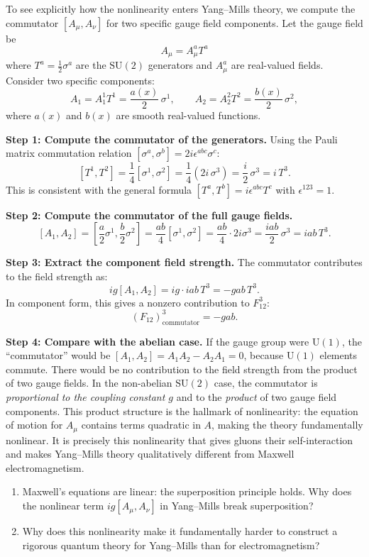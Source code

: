 \begin{example}
\label{ex:commutator}
To see explicitly how the nonlinearity enters Yang--Mills theory, we compute the commutator $[A_\mu, A_\nu]$ for two specific gauge field components. Let the gauge field be
\[
A_\mu = A_\mu^a T^a
\]
where $T^a = \frac{1}{2}\sigma^a$ are the $\mathrm{SU}(2)$ generators and $A_\mu^a$ are real-valued fields. Consider two specific components:
\[
A_1 = A_1^1 T^1 = \frac{a(x)}{2}\,\sigma^1, \qquad A_2 = A_2^2 T^2 = \frac{b(x)}{2}\,\sigma^2,
\]
where $a(x)$ and $b(x)$ are smooth real-valued functions.

\textbf{Step 1: Compute the commutator of the generators.}
Using the Pauli matrix commutation relation $[\sigma^a, \sigma^b] = 2i\epsilon^{abc}\sigma^c$:
\[
[T^1, T^2] = \frac{1}{4}[\sigma^1, \sigma^2] = \frac{1}{4}(2i\,\sigma^3) = \frac{i}{2}\,\sigma^3 = i\,T^3.
\]
This is consistent with the general formula $[T^a, T^b] = i\epsilon^{abc}T^c$ with $\epsilon^{123} = 1$.

\textbf{Step 2: Compute the commutator of the full gauge fields.}
\[
[A_1, A_2] = \left[\frac{a}{2}\sigma^1, \frac{b}{2}\sigma^2\right] = \frac{ab}{4}[\sigma^1, \sigma^2] = \frac{ab}{4}\cdot 2i\sigma^3 = \frac{iab}{2}\,\sigma^3 = iab\,T^3.
\]

\textbf{Step 3: Extract the component field strength.}
The commutator contributes to the field strength as:
\[
ig[A_1, A_2] = ig \cdot iab\,T^3 = -gab\,T^3.
\]
In component form, this gives a nonzero contribution to $F_{12}^3$:
\[
(F_{12})_{\text{commutator}}^3 = -gab.
\]

\textbf{Step 4: Compare with the abelian case.}
If the gauge group were $\mathrm{U}(1)$, the ``commutator'' would be $[A_1, A_2] = A_1 A_2 - A_2 A_1 = 0$, because $\mathrm{U}(1)$ elements commute. There would be no contribution to the field strength from the product of two gauge fields. In the non-abelian $\mathrm{SU}(2)$ case, the commutator is \emph{proportional to the coupling constant $g$} and to the \emph{product} of two gauge field components. This product structure is the hallmark of nonlinearity: the equation of motion for $A_\mu$ contains terms quadratic in $A$, making the theory fundamentally nonlinear. It is precisely this nonlinearity that gives gluons their self-interaction and makes Yang--Mills theory qualitatively different from Maxwell electromagnetism.
\end{example}

\begin{checkyou}
\begin{enumerate}
\item Maxwell's equations are linear: the superposition principle holds. Why does the nonlinear term $ig[A_\mu, A_\nu]$ in Yang--Mills break superposition?
\item Why does this nonlinearity make it fundamentally harder to construct a rigorous quantum theory for Yang--Mills than for electromagnetism?
\end{enumerate}
\end{checkyou}

